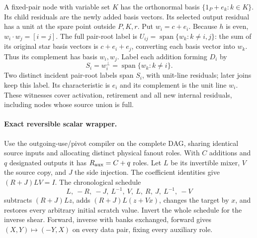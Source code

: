 A fixed-pair node with variable set $K$ has the orthonormal basis
$\{1_P+e_k:k\in K\}$. Its child residuals are the newly added basis vectors.
Its selected output residual has a unit at the spare point outside $P,K,r$.
Put $w_i=c+e_i$. Because $h$ is even, $w_i\cdot w_j=[i=j]$.
The full pair-root label is
$U_{ij}=\operatorname{span}\{w_k:k\ne i,j\}$: the sum of its original
star basis vectors is $c+e_i+e_j$, converting each basis vector into $w_k$.
Thus its complement has basis $w_i,w_j$.
Label each addition forming $D_i$ by
\[
 S_i=w_i^\perp=\operatorname{span}\{w_k:k\ne i\}.
\]
Two distinct incident pair-root labels span $S_i$, with unit-line residuals;
later joins keep this label. Its characteristic is $e_i$ and its complement
is the unit line $w_i$. These witnesses cover activation, retirement and all
new internal residuals, including nodes whose source union is full.

\paragraph{Exact reversible scalar wrapper.}
Use the outgoing-use/pivot compiler on the complete DAG, sharing identical
source inputs and allocating distinct physical fanout roles. With $C$
additions and $q$ designated outputs it has $R_{\rm aux}=C+q$ roles.
Let $L$ be its invertible mixer, $V$ the source copy, and $J$ the side
injection. The coefficient identities give $(R+J)LV=I$.
The chronological schedule
\[
 L,\ -R,\ -J,\ L^{-1},\ V,\ L,\ R,\ J,\ L^{-1},\ -V
\]
subtracts $(R+J)Lz$, adds $(R+J)L(z+Vx)$, changes the target by $x$, and
restores every arbitrary initial scratch value. Invert the whole schedule
for the inverse shear. Forward, inverse with banks exchanged, forward gives
$(X,Y)\mapsto(-Y,X)$ on every data pair, fixing every auxiliary role.


